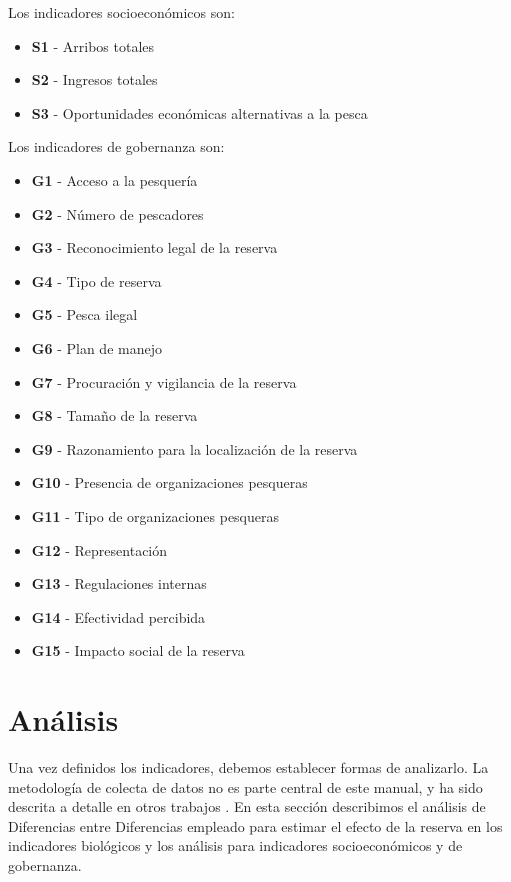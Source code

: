 \documentclass[]{krantz}
\providecommand{\tightlist}{%
  \setlength{\itemsep}{0pt}\setlength{\parskip}{0pt}}
\begin{document}
Los indicadores socioeconómicos son:

\begin{itemize}
\tightlist
\item
  \textbf{S1} - Arribos totales
\item
  \textbf{S2} - Ingresos totales
\item
  \textbf{S3} - Oportunidades económicas alternativas a la pesca
\end{itemize}

Los indicadores de gobernanza son:

\begin{itemize}
\tightlist
\item
  \textbf{G1} - Acceso a la pesquería
\item
  \textbf{G2} - Número de pescadores
\item
  \textbf{G3} - Reconocimiento legal de la reserva
\item
  \textbf{G4} - Tipo de reserva
\item
  \textbf{G5} - Pesca ilegal
\item
  \textbf{G6} - Plan de manejo
\item
  \textbf{G7} - Procuración y vigilancia de la reserva
\item
  \textbf{G8} - Tamaño de la reserva
\item
  \textbf{G9} - Razonamiento para la localización de la reserva
\item
  \textbf{G10} - Presencia de organizaciones pesqueras
\item
  \textbf{G11} - Tipo de organizaciones pesqueras
\item
  \textbf{G12} - Representación
\item
  \textbf{G13} - Regulaciones internas
\item
  \textbf{G14} - Efectividad percibida
\item
  \textbf{G15} - Impacto social de la reserva
\end{itemize}

\hypertarget{analisis}{%
\section{Análisis}\label{analisis}}

Una vez definidos los indicadores, debemos establecer formas de
analizarlo. La metodología de colecta de datos no es parte central de
este manual, y ha sido descrita a detalle en otros trabajos
\citep{suman_2010, villaseorderbez_2017, villasenorderbez_2018}. En esta
sección describimos el análisis de Diferencias entre Diferencias
empleado para estimar el efecto de la reserva en los indicadores
biológicos y los análisis para indicadores socioeconómicos y de
gobernanza.
\end{document}

